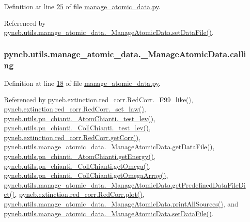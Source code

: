 Definition at line \hyperlink{manage__atomic__data_8py_source_l00025}{25} of file \hyperlink{manage__atomic__data_8py_source}{manage\+\_\+atomic\+\_\+data.\+py}.



Referenced by \hyperlink{manage__atomic__data_8py_source_l00380}{pyneb.\+utils.\+manage\+\_\+atomic\+\_\+data.\+\_\+\+Manage\+Atomic\+Data.\+set\+Data\+File()}.

\hypertarget{classpyneb_1_1utils_1_1manage__atomic__data_1_1___manage_atomic_data_ab10b91ca784741ce7af163d010802434}{}
\subsubsection[{calling}]{\setlength{\rightskip}{0pt plus 5cm}pyneb.\+utils.\+manage\+\_\+atomic\+\_\+data.\+\_\+\+Manage\+Atomic\+Data.\+calling}\label{classpyneb_1_1utils_1_1manage__atomic__data_1_1___manage_atomic_data_ab10b91ca784741ce7af163d010802434}


Definition at line \hyperlink{manage__atomic__data_8py_source_l00018}{18} of file \hyperlink{manage__atomic__data_8py_source}{manage\+\_\+atomic\+\_\+data.\+py}.



Referenced by \hyperlink{red__corr_8py_source_l00658}{pyneb.\+extinction.\+red\+\_\+corr.\+Red\+Corr.\+\_\+\+F99\+\_\+like()}, \hyperlink{red__corr_8py_source_l00176}{pyneb.\+extinction.\+red\+\_\+corr.\+Red\+Corr.\+\_\+set\+\_\+law()}, \hyperlink{pn__chianti_8py_source_l00284}{pyneb.\+utils.\+pn\+\_\+chianti.\+\_\+\+Atom\+Chianti.\+\_\+test\+\_\+lev()}, \hyperlink{pn__chianti_8py_source_l00449}{pyneb.\+utils.\+pn\+\_\+chianti.\+\_\+\+Coll\+Chianti.\+\_\+test\+\_\+lev()}, \hyperlink{red__corr_8py_source_l00211}{pyneb.\+extinction.\+red\+\_\+corr.\+Red\+Corr.\+get\+Corr()}, \hyperlink{manage__atomic__data_8py_source_l00297}{pyneb.\+utils.\+manage\+\_\+atomic\+\_\+data.\+\_\+\+Manage\+Atomic\+Data.\+get\+Data\+File()}, \hyperlink{pn__chianti_8py_source_l00346}{pyneb.\+utils.\+pn\+\_\+chianti.\+\_\+\+Atom\+Chianti.\+get\+Energy()}, \hyperlink{pn__chianti_8py_source_l00484}{pyneb.\+utils.\+pn\+\_\+chianti.\+\_\+\+Coll\+Chianti.\+get\+Omega()}, \hyperlink{pn__chianti_8py_source_l00461}{pyneb.\+utils.\+pn\+\_\+chianti.\+\_\+\+Coll\+Chianti.\+get\+Omega\+Array()}, \hyperlink{manage__atomic__data_8py_source_l00034}{pyneb.\+utils.\+manage\+\_\+atomic\+\_\+data.\+\_\+\+Manage\+Atomic\+Data.\+get\+Predefined\+Data\+File\+Dict()}, \hyperlink{red__corr_8py_source_l00303}{pyneb.\+extinction.\+red\+\_\+corr.\+Red\+Corr.\+plot()}, \hyperlink{manage__atomic__data_8py_source_l00431}{pyneb.\+utils.\+manage\+\_\+atomic\+\_\+data.\+\_\+\+Manage\+Atomic\+Data.\+print\+All\+Sources()}, and \hyperlink{manage__atomic__data_8py_source_l00380}{pyneb.\+utils.\+manage\+\_\+atomic\+\_\+data.\+\_\+\+Manage\+Atomic\+Data.\+set\+Data\+File()}.

